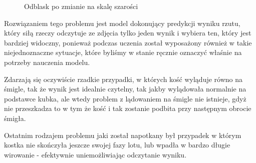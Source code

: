 \begin{figure}[H]
\begin{minipage}[t]{0.45\linewidth}
        \caption{Odblask po zmianie na skalę szarości}
        \label{fig:smiglo}
    \end{minipage}
\end{figure}

Rozwiązaniem tego problemu jest model dokonujący predykcji wyniku rzutu, który siłą rzeczy odczytuje ze zdjęcia tylko jeden wynik i wybiera ten,
który jest bardziej widoczny, ponieważ podczas uczenia został wyposażony również w takie niejednoznaczne sytuacje,
które byliśmy w stanie ręcznie oznaczyć właśnie na potrzeby nauczenia modelu.

Zdarzają się oczywiście rzadkie przypadki, w których kość wyląduje równo na śmigle, tak że wynik jest idealnie czytelny,
tak jakby wylądowała normalnie na podstawce kubka, ale wtedy problem z lądowaniem na śmigle nie istnieje,
gdyż nie przeszkadza to w tym że kość i tak zostanie podbita przy następnym obrocie śmigła.


Ostatnim rodzajem problemu jaki został napotkany był przypadek w którym kostka nie skończyła jeszcze swojej fazy lotu,
lub wpadła w bardzo długie wirowanie - efektywnie uniemożliwiając odczytanie wyniku.

